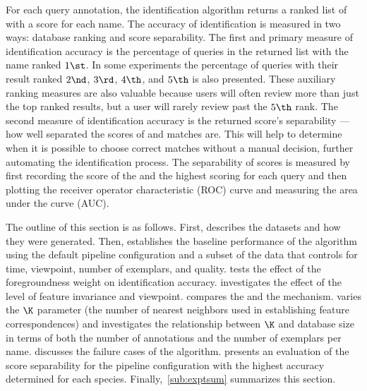     For each query annotation, the identification algorithm returns a
      ranked list of \names{} with a score for each name.
    The accuracy of identification is measured in two ways:
    database ranking and score separability.
    The first and primary measure of identification accuracy is the
      percentage of queries in the returned list with the \groundtrue{}
      name ranked $1\st$.
    In some experiments the percentage of queries with their
      \groundtrue{} result ranked $2\nd$, $3\rd$, $4\th$, and $5\th$ is
      also presented.
    These auxiliary ranking measures are also valuable because users
      will often review more than just the top ranked results, but a user
      will rarely review past the $5\th$ rank.
    The second measure of identification accuracy is the returned
      score's separability --- \ie{} how well separated the scores of
      \groundtrue{} and \groundfalse{} matches are.
    This will help to determine when it is possible to choose correct
      matches without a manual decision, further automating the
      identification process.
    The separability of scores is measured by first recording the score
      of the \groundtrue{} \name{} and the highest scoring \groundfalse{}
      \name{} for each query and then plotting the receiver operator
      characteristic (ROC) curve and measuring the area under the curve
      (AUC).

    The outline of this section is as follows.
    First,  describes the datasets and how they were
      generated.
    Then,  establishes the baseline performance of
      the algorithm using the default pipeline configuration and a subset
      of the data that controls for time, viewpoint, number of exemplars,
      and quality.
     tests the effect of the
      foregroundness weight on identification accuracy.
     investigates the effect of the level of
      feature invariance and viewpoint.
     compares the \csumprefix{} and the
      \nsumprefix{} \namescoring{} mechanism.
     varies the $\K$ parameter (the number of nearest
      neighbors used in establishing feature correspondences) and
      investigates the relationship between $\K$ and database size in
      terms of both the number of annotations and the number of exemplars
      per name.
     discusses the failure cases of the algorithm.
     presents an evaluation of the score separability
      for the pipeline configuration with the highest accuracy determined
      for each species.
    Finally,~\cref{sub:exptsum} summarizes this section.


